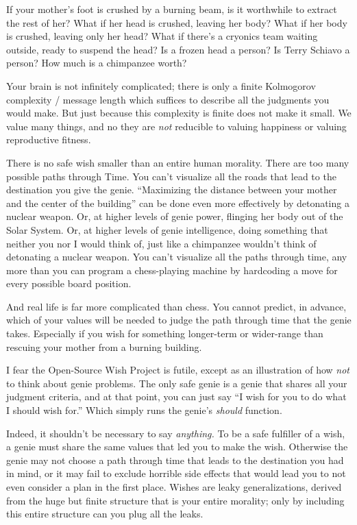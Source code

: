 {
 If your mother's foot is crushed by a burning
beam, is it worthwhile to extract the rest of her? What if her head is
crushed, leaving her body? What if her body is crushed, leaving only
her head? What if there's a cryonics team waiting
outside, ready to suspend the head? Is a frozen head a person? Is Terry
Schiavo a person? How much is a chimpanzee worth?}

{
 Your brain is not infinitely complicated; there is only a finite
Kolmogorov complexity / message length which suffices to describe all
the judgments you would make. But just because this complexity is
finite does not make it small. We value many things, and no they are
\textit{not} reducible to valuing happiness or valuing reproductive
fitness.}

{
 There is no safe wish smaller than an entire human morality. There
are too many possible paths through Time. You can't
visualize all the roads that lead to the destination you give the
genie. ``Maximizing the distance between your mother
and the center of the building'' can be done even
more effectively by detonating a nuclear weapon. Or, at higher levels
of genie power, flinging her body out of the Solar System. Or, at
higher levels of genie intelligence, doing something that neither you
nor I would think of, just like a chimpanzee wouldn't
think of detonating a nuclear weapon. You can't
visualize all the paths through time, any more than you can program a
chess-playing machine by hardcoding a move for every possible board
position.}

{
 And real life is far more complicated than chess. You cannot
predict, in advance, which of your values will be needed to judge the
path through time that the genie takes. Especially if you wish for
something longer-term or wider-range than rescuing your mother from a
burning building.}

{
 I fear the Open-Source Wish Project is futile, except as an
illustration of how \textit{not} to think about genie problems. The
only safe genie is a genie that shares all your judgment criteria, and
at that point, you can just say ``I wish for you to do
what I should wish for.'' Which simply runs the
genie's \textit{should} function.}

{
 Indeed, it shouldn't be necessary to say
\textit{anything.} To be a safe fulfiller of a wish, a genie must share
the same values that led you to make the wish. Otherwise the genie may
not choose a path through time that leads to the destination you had in
mind, or it may fail to exclude horrible side effects that would lead
you to not even consider a plan in the first place. Wishes are leaky
generalizations, derived from the huge but finite structure that is
your entire morality; only by including this entire structure can you
plug all the leaks.}

